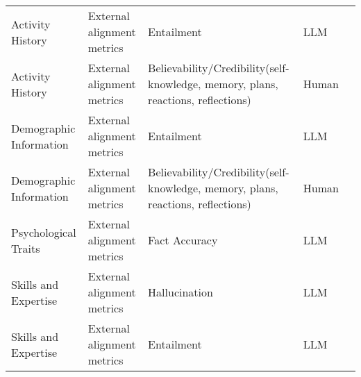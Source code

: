 \begin{small}
\begin{center}
\begin{longtable}{@{}p{}p{}p{}p{}p{}@{}}
Activity History        & External alignment metrics          & Entailment                                                                                                                                  & LLM               & \cite{Li2024SchemaGuidedCC}                                                                                                                \\
Activity History        & External alignment metrics          & Believability/Credibility(self-knowledge, memory, plans, reactions, reflections)                                                            & Human             & \cite{park2023generative}                                                                                                            \\
Demographic Information & External alignment metrics          & Entailment                                                                                                                                  & LLM               & \cite{Li2024SchemaGuidedCC}                                                                                                           \\
Demographic Information & External alignment metrics          & Believability/Credibility(self-knowledge, memory, plans, reactions, reflections)                                                            & Human             & \cite{park2023generative}                                                                                                           \\
Psychological Traits    & External alignment metrics          & Fact Accuracy                                                                                                                               & LLM               & \cite{zeng2024persllm}                                                                                                                              \\
Skills and Expertise    & External alignment metrics          & Hallucination                                                                                                                               & LLM               & \cite{shao2023character}                                                                                                            \\
Skills and Expertise    & External alignment metrics          & Entailment                                                                                                                                  & LLM               & \cite{Li2024SchemaGuidedCC}                                                                                                               \\

\end{longtable}
\end{center}
\end{small}
